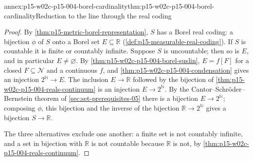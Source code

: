 \begin{annexitem}{annex:p15-w02c-p15-004-borel-cardinality}{thm:p15-w02c-p15-004-borel-cardinality}{Reduction to the line through the real coding}
\begin{proof}
By \cref{thm:p15-metric-borel-representation}, \(S\) has a Borel real
coding: a bijection \(\phi\) of \(S\) onto a Borel set
\(E\subseteq\mathbb R\) (\cref{def:p15-measurable-real-coding}). If \(S\)
is countable it is finite or countably infinite. Suppose \(S\) is
uncountable; then so is \(E\), and in particular \(E\neq\varnothing\).
By \cref{thm:p15-w02c-p15-004-borel-suslin}, \(E=f[F]\) for a closed
\(F\subseteq\mathcal N\) and a continuous \(f\), and
\cref{thm:p15-w02c-p15-004-condensation} gives an injection
\(2^{\mathbb N}\to E\). The inclusion \(E\to\mathbb R\) followed by the
bijection of \cref{thm:p15-w02c-p15-004-reals-continuum} is an injection
\(E\to2^{\mathbb N}\). By the Cantor--Schr\"oder--Bernstein theorem
of \cref{sec:set-prerequisites-05} there is a bijection
\(E\to2^{\mathbb N}\); composing \(\phi\), this bijection and the inverse
of the bijection \(\mathbb R\to2^{\mathbb N}\) gives a bijection
\(S\to\mathbb R\).

The three alternatives exclude one another: a finite set is not
countably infinite, and a set in bijection with \(\mathbb R\) is not
countable because \(\mathbb R\) is not, by
\cref{thm:p15-w02c-p15-004-reals-continuum}.
\end{proof}
\end{annexitem}

